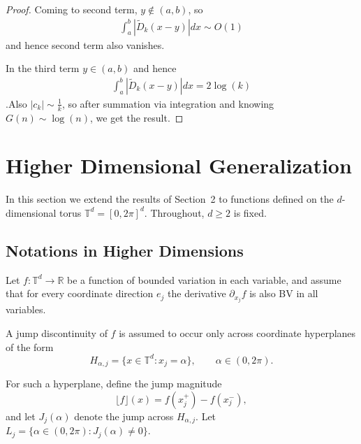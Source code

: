 \documentclass{amsart}
\theoremstyle{definition}
\theoremstyle{remark}
\numberwithin{equation}{section}
\begin{document}
\begin{proof}
Coming to second term, $y\notin(a,b)$, so  
\begin{equation}\begin{aligned}
\int_a^b\left|\tilde{D}_k(x-y)\right|dx \sim O(1)
\end{aligned}\end{equation}
and hence second term also vanishes.

In the third term $ y \in (a,b)$ and hence 
\begin{equation}\begin{aligned}
\int_a^b\left|\tilde{D}_k(x-y)\right|dx = 2\log(k)
\end{aligned}\end{equation}
.Also $|c_k|\sim \frac{1}{k}$, so after summation via integration and knowing  $G(n)\sim \log(n)$, we get the result.
\end{proof}

\section{Higher Dimensional Generalization}
\label{sec:higher-dim}

In this section we extend the results of Section~2 to functions defined on the \(d\)-dimensional torus \(\mathbb{T}^d=[0,2\pi]^d\).
Throughout, \(d\ge 2\) is fixed.

\subsection{Notations in Higher Dimensions}

Let \(f:\mathbb{T}^d\to\mathbb{R}\) be a function of bounded variation in each variable, and assume that for every coordinate direction \(e_j\) the derivative \(\partial_{x_j}f\) is also BV in all variables.

A jump discontinuity of \(f\) is assumed to occur only across coordinate hyperplanes of the form
\begin{equation*}
  H_{\alpha,j}=\{x\in\mathbb{T}^d : x_j=\alpha\},\qquad \alpha\in(0,2\pi).
\end{equation*}

For such a hyperplane, define the jump magnitude
\begin{equation*}
  \lfloor f \rfloor(x)= f(x_j^{+})-f(x_j^{-}),
\end{equation*}
and let \(J_j(\alpha)\) denote the jump across \(H_{\alpha,j}\).
Let \(L_j=\{\alpha\in(0,2\pi): J_j(\alpha)\neq 0\}\).
\end{document}
